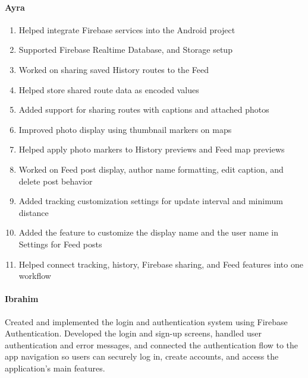 \documentclass{article}
\begin{document}
                    \paragraph{\textbf{Ayra}}
                        \begin{enumerate}
                            \item Helped integrate Firebase services into the Android project
                            \item Supported Firebase Realtime Database, and Storage setup
                            \item Worked on sharing saved History routes to the Feed
                            \item Helped store shared route data as encoded values
                            \item Added support for sharing routes with captions and attached photos
                            \item Improved photo display using thumbnail markers on maps
                            \item Helped apply photo markers to History previews and Feed map previews
                            \item Worked on Feed post display, author name formatting, edit caption, and delete post behavior
                            \item Added tracking customization settings for update interval and minimum distance
                            \item Added the feature to customize the display name and the user name in Settings for Feed posts
                            \item Helped connect tracking, history, Firebase sharing, and Feed features into one workflow
                        \end{enumerate}

                    \paragraph{\textbf{Ibrahim}} Created and implemented the login and authentication system using Firebase Authentication. Developed the login
                        and sign-up screens, handled user authentication and error messages, and connected the authentication flow to the app
                        navigation so users can securely log in, create accounts, and access the application's main features. \smiley 

    
\end{document}
